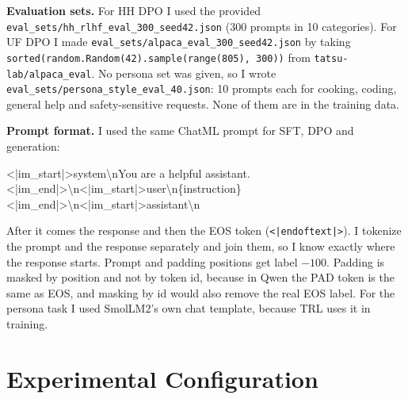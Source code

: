\documentclass[10pt,a4paper]{article}
\begin{document}
\textbf{Evaluation sets.} For HH DPO I used the provided \texttt{eval\_sets/hh\_rlhf\_eval\_300\_seed42.json} (300
prompts in 10 categories). For UF DPO I made \texttt{eval\_sets/alpaca\_eval\_300\_seed42.json} by taking
\texttt{sorted(random.Random(42).sample(range(805), 300))} from \texttt{tatsu-lab/alpaca\_eval}. No persona set was given,
so I wrote \texttt{eval\_sets/persona\_style\_eval\_40.json}: 10 prompts each for cooking, coding, general help and
safety-sensitive requests. None of them are in the training data.

\textbf{Prompt format.} I used the same ChatML prompt for SFT, DPO and generation:
\begin{center}\footnotesize\ttfamily
<|im\_start|>system\textbackslash nYou are a helpful assistant.<|im\_end|>\textbackslash n<|im\_start|>user\textbackslash n\{instruction\}<|im\_end|>\textbackslash n<|im\_start|>assistant\textbackslash n
\end{center}
After it comes the response and then the EOS token (\texttt{<|endoftext|>}). I tokenize the prompt and the response
separately and join them, so I know exactly where the response starts. Prompt and padding positions get label $-100$.
Padding is masked by position and not by token id, because in Qwen the PAD token is the same as EOS, and masking by id
would also remove the real EOS label. For the persona task I used SmolLM2's own chat template, because TRL uses it in
training.

\section{Experimental Configuration}
\end{document}

